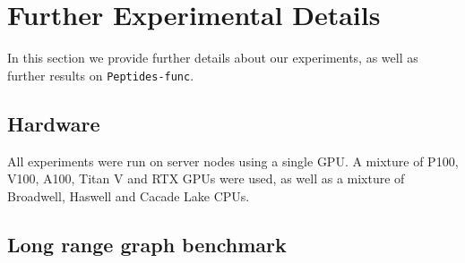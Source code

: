 \documentclass{article}
\theoremstyle{plain}
\theoremstyle{definition}
\theoremstyle{remark}
\begin{document}
\section{Further Experimental Details}
\label{appendix:experiments}
In this section we provide further details about our experiments, as well as further results on \texttt{Peptides-func}.

\subsection{Hardware}
All experiments were run on server nodes using a single GPU. A mixture of P100, V100, A100, Titan V and RTX GPUs were used, as well as a mixture of Broadwell, Haswell and Cacade Lake CPUs.

\subsection{Long range graph benchmark}
\end{document}
